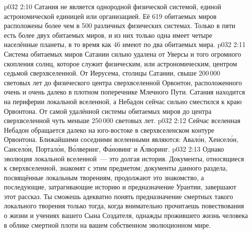 \vs p032 2:10 Сатания не является однородной физической системой, единой астрономической единицей или организацией. Её 619 обитаемых миров расположены более чем в 500 различных физических системах. Только в пяти есть более двух обитаемых миров, и из них только одна имеет четыре населённые планеты, в то время как 46 имеют по два обитаемых мира.
\vs p032 2:11 Система обитаемых миров Сатании сильно удалена от Уверсы и того огромного скопления солнц, которое служит физическим, или астрономическим, центром седьмой сверхвселенной. От Иерусема, столицы Сатании, свыше 200\,000 световых лет до физического центра сверхвселенной Орвонтон, расположенного очень и очень далеко в плотном поперечнике Млечного Пути. Сатания находится на периферии локальной вселенной, а Небадон сейчас сильно сместился к краю Орвонтона. От самой удалённой системы обитаемых миров до центра сверхвселенной чуть меньше 250\,000 световых лет.
\vs p032 2:12 Сейчас вселенная Небадон обращается далеко на юго\hyp{}востоке в сверхвселенском контуре Орвонтона. Ближайшими соседними вселенными являются: Авал\'он, Хенсел\'он, Сансел\'он, Портал\'он, В\'олверинг, Ф\'ановинг и \'Ал\-во\-ринг.
\vs p032 2:13 \pc Однако эволюция локальной вселенной~--- это долгая история. Документы, относящиеся к сверхвселенной, знакомят с этим предметом; документы данного раздела, посвящённые локальным творениям, продолжают это знакомство, а последующие, затрагивающие историю и предназначение Урантии, завершают этот рассказ. Ты сможешь адекватно понять предназначение смертных такого локального творения только тогда, когда внимательно прочитаешь повествования о жизни и учениях вашего Сына Создателя, однажды прожившего жизнь человека в облике смертной плоти на вашем собственном эволюционном мире.
